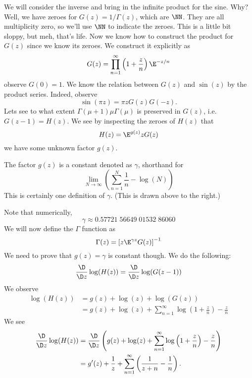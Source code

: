 We will consider the inverse and bring in the infinite product
for the sine. Why? Well, we have zeroes for $G(z)=1/\Gamma(z)$,
which are $\NN$. They are all multiplicity zero, so we'll use
$\NN$ to indicate the zeroes. This is a little bit sloppy, but
meh, that's life. Now we know how to construct the product for
$G(z)$ since we know its zeroes. We construct it explicitly as
\begin{equation}
G(z)=\prod^{\infty}_{n=1}\left(1+\frac{z}{n}\right)\E^{-z/n}
\end{equation}
observe $G(0)=1$. We know the relation between $G(z)$ and
$\sin(z)$ by the product series. Indeed, observe
\begin{equation}
\sin(\pi z)=\pi zG(z)G(-z).
\end{equation}
Lets see to what extent $\Gamma(\mu+1)\mu\Gamma(\mu)$ is
preserved in $G(z)$, i.e. $G(z-1)=H(z)$. We see by inspecting the
zeroes of $H(z)$ that
\begin{equation}
H(z)=\E^{g(z)}z G(z)
\end{equation}
we have some unknown factor $g(z)$.
\begin{thm}
The factor $g(z)$ is a constant denoted as $\gamma$, shorthand
for
\begin{equation}
\lim_{N\to\infty}\left(\sum^{N}_{n=1}\frac{1}{n}-\log(N)\right)
\end{equation}
This is certainly one definition of $\gamma$. (This is drawn above
to the right.)
\end{thm}
Note that numerically,
\begin{equation}
\gamma\approx0.57721\; 56649\; 01532\; 86060
\end{equation}
We will now define the $\Gamma$ function as
\begin{equation}
\Gamma(z)=\left[z\E^{\gamma z}G(z)\right]^{-1}
\end{equation}
We need to prove that $g(z)=\gamma$ is constant though. We do the
following:
\begin{equation}
\frac{\D}{\D z}\log(H(z))=\frac{\D}{\D z}\log(G(z-1))
\end{equation}
We observe
\begin{subequations}
\begin{align}
\log(H(z)) &= g(z) +\log(z) + \log(G(z))\\
&= g(z) + \log(z) +
\sum^{\infty}_{n=1}\log\left(1+\frac{z}{n}\right)-\frac{z}{n}
\end{align}
\end{subequations}
We see
\begin{subequations}
\begin{align}
\frac{\D}{\D z}\log(H(z)) &=\frac{\D}{\D z}\left(g(z) + \log(z) +
\sum^{\infty}_{n=1}\log\left(1+\frac{z}{n}\right)-\frac{z}{n}\right)\\
&=g'(z)+\frac{1}{z}+\sum^{\infty}_{n=1}\left(\frac{1}{z+n}-\frac{1}{n}\right).
\end{align}
\end{subequations}
